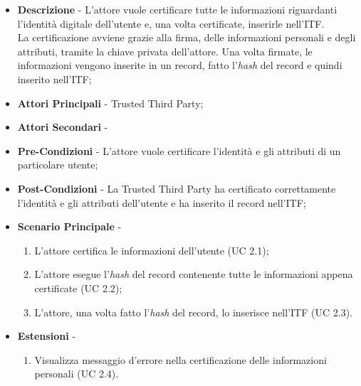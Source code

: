 \begin{itemize}
	\item \textbf{Descrizione} - L'attore vuole certificare tutte le informazioni riguardanti l'identità digitale dell'utente e, una volta certificate, inserirle nell'\gls{ITF}.\\
	La certificazione avviene grazie alla firma, delle informazioni personali e degli attributi, tramite la chiave privata dell'attore. Una volta firmate, le informazioni vengono inserite in un record, fatto l'\textit{hash} del record e quindi inserito nell'\gls{ITF};	
	\item \textbf{Attori Principali} - Trusted Third Party;
	\item \textbf{Attori Secondari} -
	\item \textbf{Pre-Condizioni} - L'attore vuole certificare l'identità e gli attributi di un particolare utente;
	\item \textbf{Post-Condizioni} - La Trusted Third Party ha certificato correttamente l'identità e gli attributi dell'utente e ha inserito il record nell'\gls{ITF};
	\item \textbf{Scenario Principale} -
	\begin{enumerate}
		\item L'attore certifica le informazioni dell'utente (UC 2.1);
		\item L'attore esegue l'\textit{hash} del record contenente tutte le informazioni appena certificate (UC 2.2);
		\item L'attore, una volta fatto l'\textit{hash} del record, lo inserisce nell'\gls{ITF} (UC 2.3).
	\end{enumerate}
	\item \textbf{Estensioni} -
	\begin{enumerate}
		\item Visualizza messaggio d'errore nella certificazione delle informazioni personali (UC 2.4).
	\end{enumerate}
\end{itemize}
